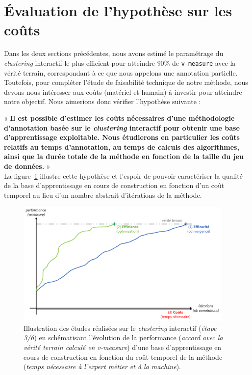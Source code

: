 \section{Évaluation de l'hypothèse sur les coûts}
\label{section:4.3-HYPOTHESE-COUTS}

	Dans les deux sections précédentes, nous avons estimé le paramétrage du \textit{clustering} interactif le plus efficient pour atteindre $90$\% de \texttt{v-measure} avec la vérité terrain, correspondant à ce que nous appelons une annotation partielle.
	Toutefois, pour compléter l'étude de faisabilité technique de notre méthode, nous devons nous intéresser aux coûts (matériel et humain) à investir pour atteindre notre objectif.
	Nous aimerions donc vérifier l'hypothèse suivante :
	
	\begin{tcolorbox}[
		title=\faVial~\textbf{Hypothèse sur les coûts}~\faVial,
		colback=colorTcolorboxHypothesis!15,
		colframe=colorTcolorboxHypothesis!75,
		width=\linewidth
	]
		«\textbf{
			Il est possible d'estimer les coûts nécessaires d'une méthodologie d'annotation basée sur le \textit{clustering} interactif pour obtenir une base d'apprentissage exploitable.
			Nous étudierons en particulier les coûts relatifs au temps d'annotation, au temps de calculs des algorithmes, ainsi que la durée totale de la méthode en fonction de la taille du jeu de données.
		} » \\
		
		La figure~\ref{figure:4.3-HYPOTHESE-COUTS} illustre cette hypothèse et l'espoir de pouvoir caractériser la qualité de la base d'apprentissage en cours de construction en fonction d'un coût temporel au lieu d'un nombre abstrait d'itérations de la méthode. 
		\begin{figure}[H]  %
			\centering
			\includegraphics[width=0.95\textwidth]{figures/hypotheses-03-couts}
			\caption{Illustration des études réalisées sur le \textit{clustering} interactif (\textit{étape 3/6}) en schématisant l'évolution de la performance (\textit{accord avec la vérité terrain calculé en v-measure}) d'une base d'apprentissage en cours de construction en fonction du coût temporel de la méthode (\textit{temps nécessaire à l'expert métier et à la machine}).}
			\label{figure:4.3-HYPOTHESE-COUTS}
		\end{figure}

	\end{tcolorbox}

